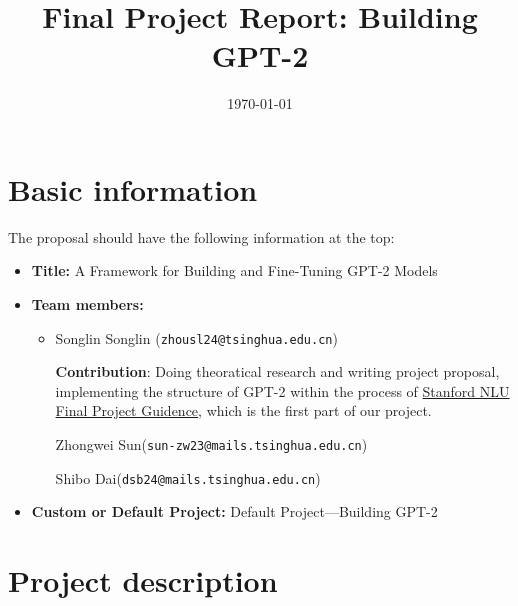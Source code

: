 \documentclass{article}
\title{Final Project Report: Building GPT-2}
\date{\today}
\theoremstyle{definition}
\begin{document}
    \maketitle
    \tableofcontents
  \section{Basic information}


  The proposal should have the following information at the top:
  \begin{itemize}
    \item \textbf{Title:} A Framework for Building and Fine-Tuning GPT-2 Models
    \item \textbf{Team members:} 
    \begin{itemize}
      \item Songlin Songlin (\texttt{zhousl24@tsinghua.edu.cn})
      
      \textbf{Contribution}: Doing theoratical research and writing project proposal, 
implementing the structure of GPT-2 within the process of
\href{https://github.com/AGIXLab/NLU-Course-Project-GPT-and-Downstream-Tasks/tree/main}{Stanford NLU Final Project Guidence},
which is the first part of our project.


      Zhongwei Sun(\texttt{sun-zw23@mails.tsinghua.edu.cn})

      Shibo Dai(\texttt{dsb24@mails.tsinghua.edu.cn})
    \end{itemize}
    \item \textbf{Custom or Default Project:} 
      Default Project---Building GPT-2
  \end{itemize}
  





  



  \section{Project description}
\end{document}

